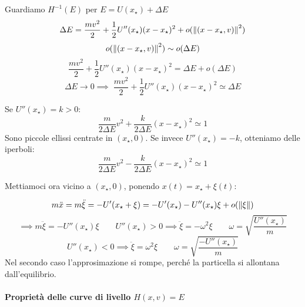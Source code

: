Guardiamo $H^{-1}(E)$ per $E = U(x_\star) + \Delta E$
\begin{equation}
    \Delta E = \frac{mv^2}{2} + \frac{1}{2} U''(x_\star)(x - x_\star)^2 + o(\norm{(x - x_\star, v)}^2)
\end{equation}
\begin{equation}
    o(\norm{(x - x_\star, v)}^2) \sim o(\Delta E)
\end{equation}
\begin{equation*}
    \frac{mv^2}{2} + \frac{1}{2} U''(x_\star)(x - x_\star)^2 = \Delta E + o(\Delta E)
\end{equation*}
\begin{equation}
    \Delta E \to 0\implies \;\frac{mv^2}{2} + \frac{1}{2} U''(x_\star)(x - x_\star)^2 \simeq \Delta E
\end{equation}

Se $U''(x_\star)= k>0$:
\begin{equation}
    \frac{m}{2\Delta E}v^2 + \frac{k}{2\Delta E}(x - x_\star)^2 \simeq 1
\end{equation}
Sono piccole ellissi centrate in $(x_\star, 0)$. Se invece $U''(x_\star) = -k$, otteniamo delle iperboli:
\begin{equation}
    \frac{m}{2\Delta E}v^2 - \frac{k}{2\Delta E}(x - x_\star)^2 \simeq 1
\end{equation}


Mettiamoci ora vicino a $(x_\star,0)$, ponendo $x(t)= x_\star + \xi(t)$:

\begin{equation}
    m \ddot{x} = m \ddot{\xi} = -U'(x_\star + \xi) = -U'(x_\star) - U''(x_\star)\xi + o(\norm{\xi})
\end{equation}
\begin{equation}
    \implies m \ddot{\xi} = - U''(x_\star)\xi
    \qquad U''(x_\star) > 0 \implies \ddot{\xi} = - \omega^2 \xi \qquad \omega = \sqrt{\frac{U''(x_\star)}{m}}
\end{equation}
\begin{equation}
    U''(x_\star) < 0 \implies \ddot{\xi} = \omega^2 \xi \qquad \omega = \sqrt{\frac{-U''(x_\star)}{m}}
\end{equation}
Nel secondo caso l'approsimazione si rompe, perché la particella si allontana dall'equilibrio.

\paragraph{Proprietà delle curve di livello $H(x,v)=E$}

